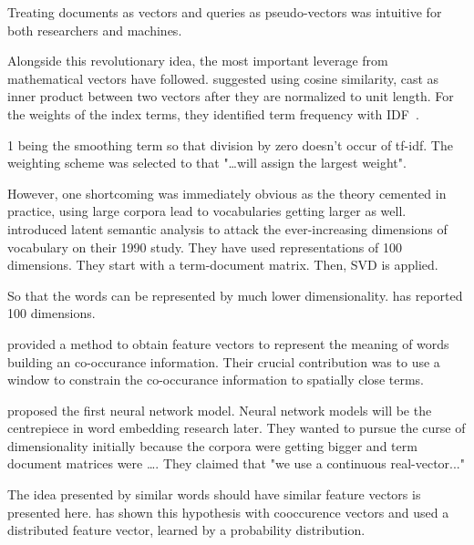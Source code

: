 Treating documents as vectors and queries as pseudo-vectors was intuitive for both researchers and machines.

Alongside this revolutionary idea, the most important leverage from mathematical vectors have followed.
\citeauthor{salton_vector_1975} suggested using cosine similarity, cast as inner product between two vectors after they are normalized to unit length.
For the weights of the index terms, they identified term frequency with IDF~\cite{jones_statistical_1972}.

1 being the smoothing term so that division by zero doesn't occur of tf-idf.
The weighting scheme was selected to that "\ldots will assign the largest weight".

However, one shortcoming was immediately obvious as the theory cemented in practice, using large corpora lead to vocabularies getting larger as well.
\citeauthor{deerwester_indexing_1990} introduced latent semantic analysis to attack the ever-increasing dimensions of vocabulary on their 1990 study.
They have used representations of 100 dimensions.
They start with a term-document matrix.
Then, SVD is applied.


So that the words can be represented by much lower dimensionality.
\citeauthor{deerwester_indexing_1990} has reported 100 dimensions.

\citeauthor{lund_producing_1996} provided a method to obtain feature vectors to represent the meaning of words building an co-occurance  information.
Their crucial contribution was to use a window to constrain the co-occurance information to spatially close terms.

\textcite{bengio_neural_2000} proposed the first neural network model.
Neural network models will be the centrepiece in word embedding research later.
They wanted to pursue the curse of dimensionality initially because the corpora were getting bigger and term document matrices were \ldots.
They claimed that "we use a continuous real-vector..."

The idea presented by \citeauthor{lund_producing_1996} similar words should have similar feature vectors is presented here.
\citeauthor{lund_producing_1996} has shown this hypothesis with cooccurence vectors and \citeauthor{bengio_neural_2000} used a distributed feature vector, learned by a probability distribution.

